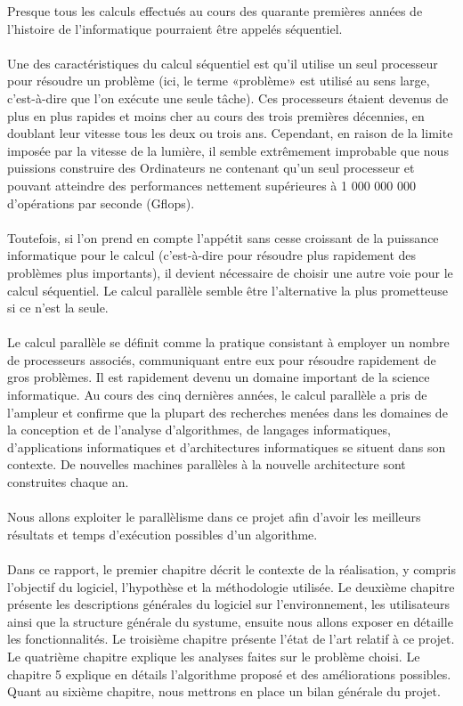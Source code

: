 \documentclass{polytech/polytech}
\begin{document}
        Presque tous les calculs effectués au cours des quarante premières années de l’histoire de l’informatique pourraient être appelés séquentiel. \\\\
        Une des caractéristiques du calcul séquentiel est qu’il utilise un seul processeur pour résoudre un problème (ici, le terme «problème» est utilisé au sens large, c’est-à-dire que l’on exécute une seule tâche). Ces processeurs étaient devenus de plus en plus rapides et moins cher au cours des trois premières décennies, en doublant leur vitesse tous les deux ou trois ans. Cependant, en raison de la limite imposée par la vitesse de la lumière, il semble extrêmement improbable que nous puissions construire des Ordinateurs ne contenant qu'un seul processeur et pouvant atteindre des performances nettement supérieures à 1 000 000 000 d'opérations par seconde (Gflops).\\\\
        Toutefois, si l’on prend en compte l’appétit sans cesse croissant de la puissance informatique pour le calcul (c'est-à-dire pour résoudre plus rapidement des problèmes plus importants), il devient nécessaire de choisir une autre voie pour le calcul séquentiel. Le calcul parallèle semble être l’alternative la plus prometteuse si ce n’est la seule.\\\\
        Le calcul parallèle se définit comme la pratique consistant à employer un nombre de processeurs associés, communiquant entre eux pour résoudre rapidement de gros problèmes. Il est rapidement devenu un domaine important de la science informatique. Au cours des cinq dernières années, le calcul parallèle a pris de l'ampleur et confirme que la plupart des recherches menées dans les domaines de la conception et de l'analyse d'algorithmes, de langages informatiques, d'applications informatiques et d'architectures informatiques se situent dans son contexte. De nouvelles machines parallèles à la nouvelle architecture sont construites chaque an.\\\\
        Nous allons exploiter le parallèlisme dans ce projet afin d'avoir les meilleurs résultats et temps d'exécution possibles d'un algorithme.\\\\
        Dans ce rapport, le premier chapitre décrit le contexte de la réalisation, y compris l’objectif du logiciel, l’hypothèse et la méthodologie utilisée. Le deuxième chapitre présente les descriptions générales du logiciel sur l’environnement, les utilisateurs ainsi que la structure générale du systume,  ensuite nous allons exposer en détaille les fonctionnalités. Le troisième chapitre présente l'état de l'art relatif à ce projet. Le quatrième chapitre explique les analyses faites sur le problème choisi. Le chapitre 5 explique en détails l’algorithme proposé et des améliorations possibles. Quant au sixième chapitre, nous mettrons en place un bilan générale du projet.\\\\
\end{document}
